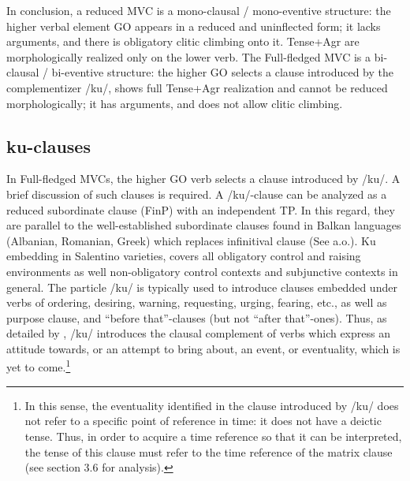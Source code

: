 \documentclass[output=paper]{langscibook}
\begin{document}
\ea \label{ac10}
    \z
\z

In conclusion, a reduced MVC is a mono-clausal / mono-eventive structure: the higher verbal element GO appears in a reduced and uninflected form; it lacks arguments, and there is obligatory clitic climbing onto it.   Tense+Agr are morphologically realized only on the lower verb.  The Full-fledged MVC is a bi-clausal / bi-eventive structure: the higher GO selects a clause introduced by the complementizer /ku/, shows full Tense+Agr realization and cannot be reduced morphologically; it has arguments, and does not allow clitic climbing. 

\subsection{ku-clauses}

In Full-fledged MVCs, the higher GO verb selects a clause introduced by /ku/.  A brief discussion of such clauses is required.  A /ku/-clause can be analyzed as a reduced subordinate clause (FinP) with an independent TP.  In this regard, they are parallel to the well-established subordinate clauses found in Balkan languages (Albanian, Romanian, Greek) which replaces infinitival clause (See \cite{calabrese1993a, rivero1994a, manzini2005a, roberts2003a} a.o.). Ku embedding in Salentino varieties, covers all obligatory control and raising environments as well non-obligatory control contexts and subjunctive contexts in general. The particle /ku/ is typically used to introduce clauses embedded under verbs of ordering, desiring, warning, requesting, urging, fearing, etc., as well as purpose clause, and “before that”-clauses (but not “after that”-ones). Thus, as detailed by \citet{calabrese1993a}, /ku/ introduces the clausal complement of verbs which express an attitude towards, or an attempt to bring about, an event, or eventuality, which is yet to come.\footnote{In this sense, the eventuality identified in the clause introduced by /ku/ does not refer to a specific point of reference in time: it does not have a deictic tense.  Thus, in order to acquire a time reference so that it can be interpreted, the tense of this clause must refer to the time reference of the matrix clause (see section 3.6 for analysis).}
\end{document}
